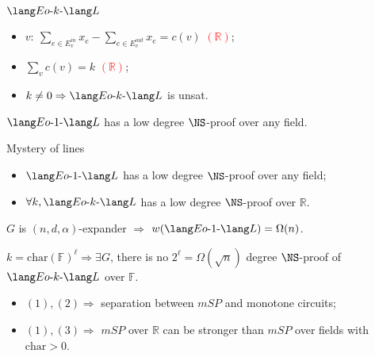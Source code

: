 \begin{frame}{$\EoL[k]$}
    \begin{minipage}{0.5 \linewidth}
        
    \end{minipage}%
    \begin{minipage}{0.5 \linewidth}
        \pause
        \pause
        \begin{itemize}
            \item $v: ~ \sum\limits_{e \in E^{in}_v} x_{e} - \sum\limits_{e \in E^{out}_v} x_{e} = c(v)$
                \textcolor{red}{$(\mathbb{R})$};
            \item $\sum\limits_{v} c(v) = k$ \textcolor{red}{$(\mathbb{R})$};
            \item $k \neq 0 \Rightarrow \EoL[k]$ is unsat. 
        \end{itemize}
    \end{minipage}

    \pause
    \begin{lemma}
        $\EoL[1]$ has a low degree $\NS$-proof over any field.
    \end{lemma}
\end{frame}

\begin{frame}{Mystery of lines}

    \begin{lemma}[1]
        \begin{itemize}
            \item $\EoL[1]$ has a low degree $\NS$-proof over any field;
            \item $\forall k, \EoL[k]$ has a low degree $\NS$-proof over $\mathbb{R}$.
        \end{itemize}
    \end{lemma}

    \begin{lemma}[2]
        $G$ is $(n, d, \alpha)$-expander $\Rightarrow$ $w(\EoL[1]) = \Omega(n)$.
    \end{lemma}

    \begin{lemma}[3]
        $k = \mathrm{char}(\mathbb{F})^{\ell} \Rightarrow \exists G$, there is no $2^{\ell} =
        \Omega(\sqrt{n})$ degree $\NS$-proof of $\EoL[k]$ over $\mathbb{F}$.
    \end{lemma}

    \begin{itemize}
        \item $(1), (2) \Rightarrow$ separation between $mSP$ and monotone circuits;
        \item $(1), (3) \Rightarrow$ $mSP$ over $\mathbb{R}$ can be stronger than $mSP$ over fields with
            $\mathrm{char} > 0$. 
    \end{itemize}

\end{frame}


